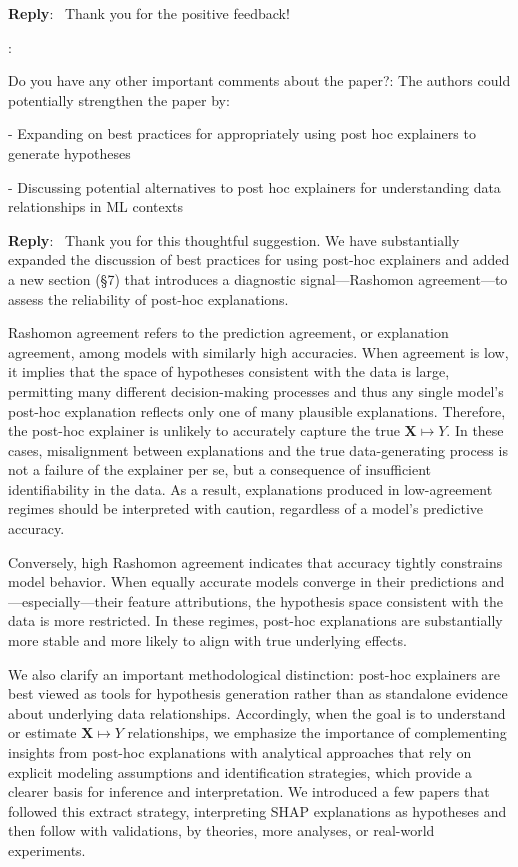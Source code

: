 \documentclass[11pt]{article}
\newcounter{se}[section]
\newcounter{reviewer}
\newcounter{point}[reviewer]
\renewcommand{\thepoint}{R\,\thereviewer.\arabic{point}}
\newenvironment{point}{
    \refstepcounter{point} \bigskip \noindent {\textbf{\thepoint}}: \rmfamily \itshape
}{\medskip}
\newenvironment{reply}
 {\par\medskip \noindent \begin{sf}\textbf{Reply}:\ }
 {\medskip \end{sf}}
\begin{document}
\begin{reply}
Thank you for the positive feedback!
\end{reply}

\begin{point}
Do you have any other important comments about the paper?: The authors could potentially strengthen the paper by:

- Expanding on best practices for appropriately using post hoc explainers to generate hypotheses

- Discussing potential alternatives to post hoc explainers for understanding data relationships in ML contexts

\end{point}

\begin{reply}
Thank you for this thoughtful suggestion. We have substantially expanded the discussion of best practices for using post-hoc explainers and added a new section (\S7) that introduces a diagnostic signal—Rashomon agreement—to assess the reliability of post-hoc explanations.

Rashomon agreement refers to the prediction agreement, or explanation agreement, among models with similarly high accuracies. When agreement is low, it implies that the space of hypotheses consistent with the data is large, permitting many different decision-making processes and thus any single model’s post-hoc explanation reflects only one of many plausible explanations. Therefore, the post-hoc explainer is unlikely to accurately capture the true $\mathbf{X} \mapsto Y$. In these cases, misalignment between explanations and the true data-generating process is not a failure of the explainer per se, but a consequence of insufficient identifiability in the data. As a result, explanations produced in low-agreement regimes should be interpreted with caution, regardless of a model’s predictive accuracy.

Conversely, high Rashomon agreement indicates that accuracy tightly constrains model behavior. When equally accurate models converge in their predictions and—especially—their feature attributions, the hypothesis space consistent with the data is more restricted. In these regimes, post-hoc explanations are substantially more stable and more likely to align with true underlying effects. 


We also clarify an important methodological distinction: post-hoc explainers are best viewed as tools for hypothesis generation rather than as standalone evidence about underlying data relationships. Accordingly, when the goal is to understand or estimate $\mathbf{X} \mapsto Y$ relationships, we emphasize the importance of complementing insights from post-hoc explanations with analytical approaches that rely on explicit modeling assumptions and identification strategies, which provide a clearer basis for inference and interpretation. We introduced a few papers that followed this extract strategy, interpreting SHAP explanations as hypotheses and then follow with validations, by theories, more analyses, or real-world experiments.
\end{reply}
\end{document}
